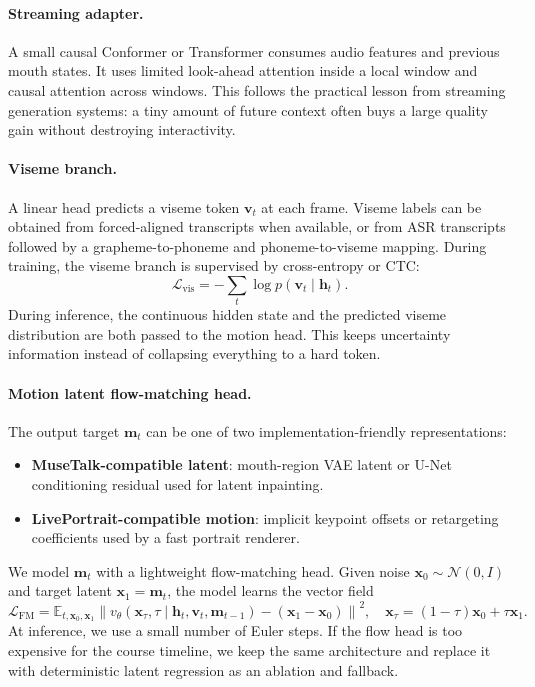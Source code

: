 \documentclass{article}
\begin{document}
\paragraph{Streaming adapter.}
A small causal Conformer or Transformer consumes audio features and previous mouth states. It uses limited look-ahead attention inside a local window and causal attention across windows. This follows the practical lesson from streaming generation systems: a tiny amount of future context often buys a large quality gain without destroying interactivity.

\paragraph{Viseme branch.}
A linear head predicts a viseme token $\mathbf{v}_t$ at each frame. Viseme labels can be obtained from forced-aligned transcripts when available, or from ASR transcripts followed by a grapheme-to-phoneme and phoneme-to-viseme mapping. During training, the viseme branch is supervised by cross-entropy or CTC:
\begin{equation}
    \mathcal{L}_{\text{vis}} = - \sum_t \log p(\mathbf{v}_t \mid \mathbf{h}_t).
\end{equation}
During inference, the continuous hidden state and the predicted viseme distribution are both passed to the motion head. This keeps uncertainty information instead of collapsing everything to a hard token.

\paragraph{Motion latent flow-matching head.}
The output target $\mathbf{m}_t$ can be one of two implementation-friendly representations:
\begin{itemize}
    \item \textbf{MuseTalk-compatible latent}: mouth-region VAE latent or U-Net conditioning residual used for latent inpainting.
    \item \textbf{LivePortrait-compatible motion}: implicit keypoint offsets or retargeting coefficients used by a fast portrait renderer.
\end{itemize}
We model $\mathbf{m}_t$ with a lightweight flow-matching head. Given noise $\mathbf{x}_0 \sim \mathcal{N}(0,I)$ and target latent $\mathbf{x}_1=\mathbf{m}_t$, the model learns the vector field
\begin{equation}
    \mathcal{L}_{\text{FM}}
    =
    \mathbb{E}_{t,\mathbf{x}_0,\mathbf{x}_1}
    \left\|
    v_\theta(\mathbf{x}_\tau,\tau \mid \mathbf{h}_t, \mathbf{v}_t, \mathbf{m}_{t-1})
    -
    (\mathbf{x}_1-\mathbf{x}_0)
    \right\|^2,
    \quad
    \mathbf{x}_\tau=(1-\tau)\mathbf{x}_0+\tau\mathbf{x}_1.
\end{equation}
At inference, we use a small number of Euler steps. If the flow head is too expensive for the course timeline, we keep the same architecture and replace it with deterministic latent regression as an ablation and fallback.
\end{document}
